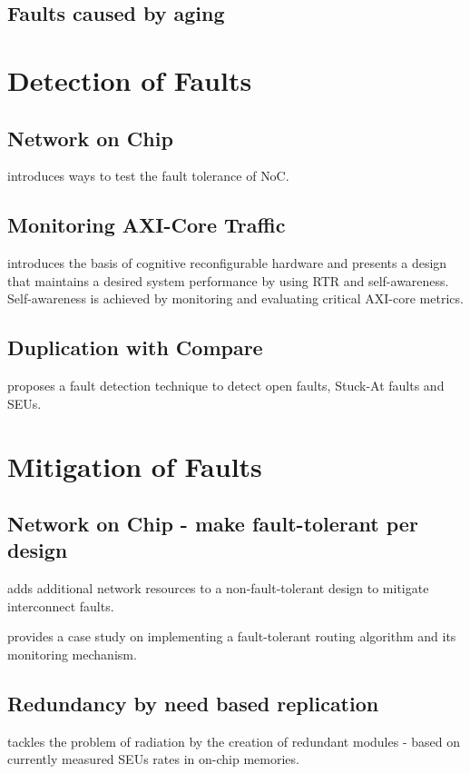 \documentclass[10pt, journal]{IEEEtran}
\begin{document}
\subsection{Faults caused by aging}

\section{Detection of Faults}
\subsection{Network on Chip}
\cite{sterpone_new_2012} introduces ways to test the fault tolerance of \gls{NoC}.
\subsection{Monitoring AXI-Core Traffic}
\cite{navas_towards_2015} introduces the basis of cognitive reconfigurable hardware and presents a design that maintains a desired system performance by using \gls{RTR} and self-awareness.
Self-awareness is achieved by monitoring and evaluating critical AXI-core metrics.

\subsection{Duplication with Compare}
\cite{alkady_dynamic_2015} proposes a fault detection technique to detect open faults, Stuck-At faults and \glspl{SEU}.

\section{Mitigation of Faults}
\subsection{Network on Chip - make fault-tolerant per design}
\cite{yesil_fpga_2016} adds additional network resources to a non-fault-tolerant design to mitigate interconnect faults.

\cite{lu_fault-tolerant_2015} provides a case study on implementing a fault-tolerant routing algorithm and its monitoring mechanism.
\subsection{Redundancy by need based replication}
\cite{glein_self-adaptive_2014} tackles the problem of radiation by the creation of redundant modules - based on currently measured \glspl{SEU} rates in on-chip memories.
\end{document}
